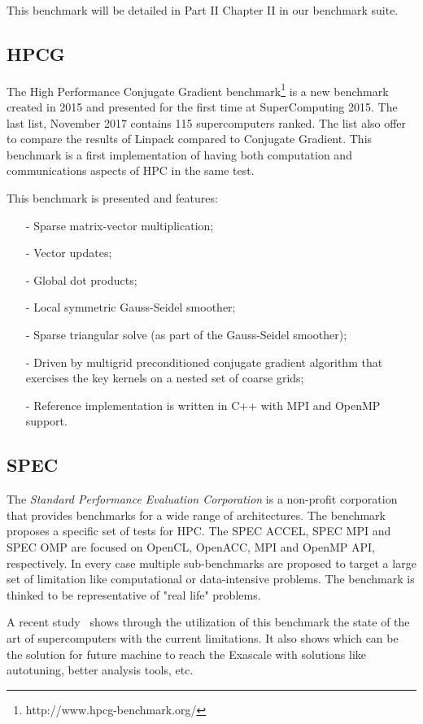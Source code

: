 This benchmark will be detailed in Part II Chapter II in our benchmark suite. 

\subsection{HPCG}
The High Performance Conjugate Gradient benchmark\footnote{http://www.hpcg-benchmark.org/} is a new benchmark created in 2015 and presented for the first time at SuperComputing 2015. 
The last list, November 2017 contains 115 supercomputers ranked. 
The list also offer to compare the results of Linpack compared to Conjugate Gradient. 
This benchmark is a first implementation of having both computation and 
communications aspects of HPC in the same test. 

This benchmark is presented and features:
\begin{itemize}[noitemsep,nolistsep]
\item[-] Sparse matrix-vector multiplication;
\item[-] Vector updates;
\item[-] Global dot products;
\item[-] Local symmetric Gauss-Seidel smoother;
\item[-] Sparse triangular solve (as part of the Gauss-Seidel smoother);
\item[-] Driven by multigrid preconditioned conjugate gradient algorithm that exercises the key kernels on a nested set of coarse grids;
\item[-] Reference implementation is written in C++ with MPI and OpenMP support.\\
\end{itemize}

\subsection{SPEC}
The \textit{Standard Performance Evaluation Corporation} is a non-profit corporation that provides benchmarks for a wide range of architectures. 
The benchmark proposes a specific set of tests for HPC.
The SPEC ACCEL, SPEC MPI and SPEC OMP are focused on OpenCL, OpenACC, MPI and OpenMP API, respectively. 
In every case multiple sub-benchmarks are proposed to target a large set of limitation like computational or data-intensive problems. 
The benchmark is thinked to be representative of "real life" problems. 

A recent study~\cite{8430508} shows through the utilization of this benchmark the state of the art of supercomputers with the current limitations. 
It also shows which can be the solution for future machine to reach the Exascale with solutions like autotuning, better analysis tools, etc.\\

